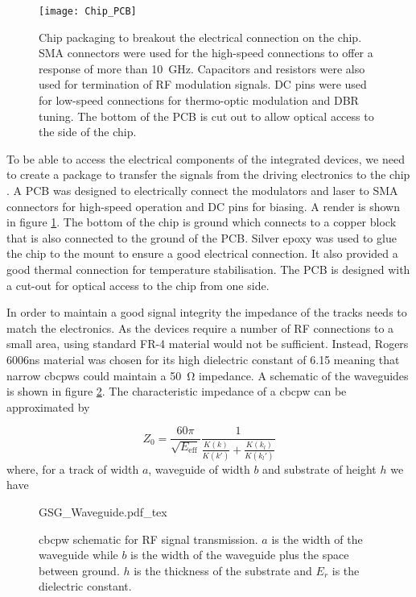 \begin{figure}[t]
	\centering
	\texttt{[image: Chip\_PCB]}
	\caption[Transmitter PCB package]{Chip packaging to breakout the electrical connection on the chip. SMA connectors were used for the high-speed connections to offer a response of more than \SI{10}{\GHz}. Capacitors and resistors were also used for termination of RF modulation signals. DC pins were used for low-speed connections for thermo-optic modulation and \ac{DBR} tuning. The bottom of the PCB is cut out to allow optical access to the side of the chip.}
	\label{fig:chip_pcb}
\end{figure}

To be able to access the electrical components of the integrated devices, we need to create a package to transfer the signals from the driving electronics to the chip . A PCB was designed to electrically connect the modulators and laser to SMA connectors for high-speed operation and DC pins for biasing. A render is shown in figure \ref{fig:chip_pcb}. The bottom of the chip is ground which connects to a copper block that is also connected to the ground of the PCB. Silver epoxy was used to glue the chip to the mount to ensure a good electrical connection. It also provided a good thermal connection for temperature stabilisation. The PCB is designed with a cut-out for optical access to the chip from one side.

In order to maintain a good signal integrity the impedance of the tracks needs to match the electronics. As the devices require a number of RF connections to a small area, using standard FR-4 material would not be sufficient. Instead, Rogers 6006ns material was chosen for its high dielectric constant of \num{6.15} meaning that narrow \acp{cbcpw} could maintain a \SI{50}{\ohm} impedance. A schematic of the waveguides is shown in figure \ref{fig:GSG_waveguide}. The characteristic impedance of a \ac{cbcpw} can be approximated by \cite{wadell1991}

\begin{equation}
	Z_0 = \frac{60\pi}{\sqrt{E_\text{eff}}}\frac{1}{\frac{K(k)}{K(k')} + \frac{K(k_l)}{K(k_l')}}
\end{equation}
where, for a track of width $a$, waveguide of width $b$ and substrate of height $h$ we have

\begin{figure}[t]
	\centering
	\Large
	\def\svgwidth{0.6\textwidth} 
	{GSG_Waveguide.pdf_tex}
	\caption[Conductor-backed coplanar waveguide structure]{\ac{cbcpw} schematic for RF signal transmission. $a$ is the width of the waveguide while $b$ is the width of the waveguide plus the space between ground. $h$ is the thickness of the substrate and $E_r$ is the dielectric constant.}
	\label{fig:GSG_waveguide}
\end{figure}

